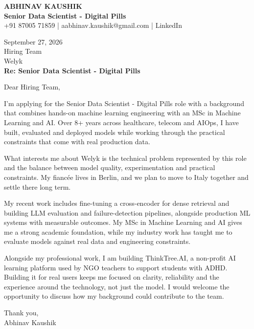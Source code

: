 \documentclass[10pt,a4paper]{article}
\begin{document}
\begin{center}
{\Large\bfseries ABHINAV KAUSHIK}\\[2pt]
{\bfseries Senior Data Scientist - Digital Pills}\\[2pt]
+91 87005 71859 \quad | \quad aabhinav.kaushik@gmail.com \quad | \quad LinkedIn
\end{center}
\vspace{8pt}
September 27, 2026\\[6pt]
Hiring Team\\
Welyk\\[4pt]
\textbf{Re: Senior Data Scientist - Digital Pills}

Dear Hiring Team,

I’m applying for the Senior Data Scientist - Digital Pills role with a background that combines hands-on machine learning engineering with an MSc in Machine Learning and AI. Over 8+ years across healthcare, telecom and AIOps, I have built, evaluated and deployed models while working through the practical constraints that come with real production data.

What interests me about Welyk is the technical problem represented by this role and the balance between model quality, experimentation and practical constraints. My fiancée lives in Berlin, and we plan to move to Italy together and settle there long term.

My recent work includes fine-tuning a cross-encoder for dense retrieval and building LLM evaluation and failure-detection pipelines, alongside production ML systems with measurable outcomes. My MSc in Machine Learning and AI gives me a strong academic foundation, while my industry work has taught me to evaluate models against real data and engineering constraints.

Alongside my professional work, I am building ThinkTree.AI, a non-profit AI learning platform used by NGO teachers to support students with ADHD. Building it for real users keeps me focused on clarity, reliability and the experience around the technology, not just the model. I would welcome the opportunity to discuss how my background could contribute to the team.

Thank you,\\
Abhinav Kaushik
\end{document}
